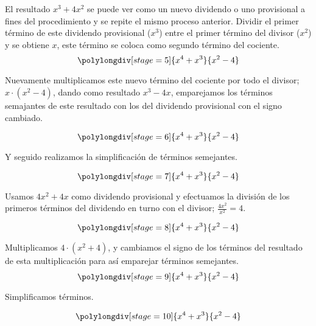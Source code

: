 \documentclass[11pt,letterpaper,oneside]{book}
\numberwithin{equation}{section}
\begin{document}
	\par El resultado $x^3+4x^2$ se puede ver como un nuevo dividendo o uno provisional a fines del procedimiento y se repite el mismo proceso anterior. Dividir el primer término de este dividendo provisional ($x^3$) entre el primer término del divisor ($x^2$) y se obtiene $x$, este término se coloca como segundo término del cociente.
		\begin{equation*}
		\polylongdiv[stage=5]{x^4+x^3}{x^2-4}	
		\end{equation*}	
	
	\par Nuevamente multiplicamos este nuevo término del cociente por todo el divisor; $x \cdot (x^2-4)$, dando como resultado $x^3-4x$, emparejamos los términos semajantes de este resultado con los del dividendo provisional con el signo cambiado.
	
		\begin{equation*}
 		\polylongdiv[stage=6]{x^4+x^3}{x^2-4}	
		\end{equation*}
	
	\par Y seguido realizamos la simplificación de términos semejantes.
	
		\begin{equation*}
		\polylongdiv[stage=7]{x^4+x^3}{x^2-4}	
		\end{equation*}
	
	\par Usamos $4x^2+4x$ como dividendo provisional y efectuamos la división de los primeros términos del dividendo en turno con el divisor; $\frac{4x^2}{x^2} = 4$.
	
		\begin{equation*}
		\polylongdiv[stage=8]{x^4+x^3}{x^2-4}	
		\end{equation*}	
	
	\par Multiplicamos $4\cdot (x^2+4)$, y cambiamos el signo de los términos del resultado de esta multiplicación para así emparejar términos semejantes.
		\begin{equation*}
		\polylongdiv[stage=9]{x^4+x^3}{x^2-4}	
		\end{equation*}	
	
	\par Simplificamos términos.
	
		\begin{equation*}
		\polylongdiv[stage=10]{x^4+x^3}{x^2-4}	
		\end{equation*}	
	
\end{document}
